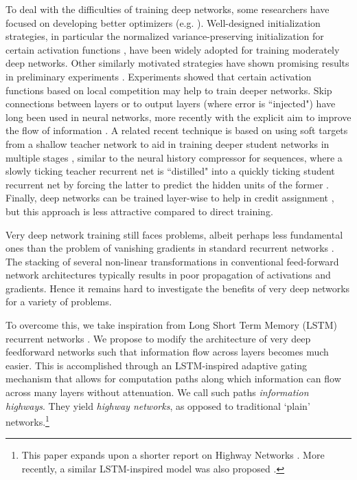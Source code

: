 \documentclass{article}
\begin{document}
To deal with the difficulties of training deep networks, some researchers have focused on developing better optimizers (e.g. \cite{Martens2012,Sutskever2013,Dauphin2014}). Well-designed initialization strategies, in particular the normalized variance-preserving initialization for certain activation functions \cite{Glorot2010,He2015}, have been widely adopted for training moderately deep networks. Other similarly motivated strategies have shown promising results in preliminary experiments \cite{Sussillo2014,Saxe2013}.
Experiments showed that certain activation functions based on local competition \cite{Goodfellow2013,Srivastava2013} may help to train deeper networks.
Skip connections between layers or to output layers (where error is ``injected") have long been used in neural networks, more recently with the explicit aim to improve the flow of information \cite{Raiko2012,Graves2013,Szegedy2014,Lee2015}. 
A related recent technique is based on using soft targets from a shallow teacher network to aid in training deeper student networks in multiple stages \cite{Romero2014}, similar to the neural history compressor for sequences, where a slowly ticking teacher recurrent net is ``distilled" into a quickly ticking student recurrent net by forcing the latter to predict the hidden units of the former \cite{Schmidhuber1992}. Finally, deep networks can be trained layer-wise to help in credit assignment \cite{Schmidhuber1992,Hinton2006}, but this approach is less attractive compared to direct training.

Very deep network training still faces problems, albeit perhaps less fundamental ones than the problem of vanishing gradients in standard recurrent networks \cite{Hochreiter1991}. The stacking of several non-linear transformations in conventional feed-forward network architectures typically results in poor propagation of activations and gradients. Hence it remains hard to investigate the benefits of very deep networks for a variety of problems.


To overcome this, we take inspiration from Long Short Term Memory (LSTM) recurrent networks \cite{Hochreiter1997,Gers1999}. We propose to modify the architecture of very deep feedforward networks such that information flow across layers becomes much easier. This is accomplished through an LSTM-inspired adaptive gating mechanism that allows for computation paths along which information can flow across many layers without attenuation. We call such paths \emph{information highways}. They yield \emph{highway networks}, as opposed to traditional `plain' networks.\footnote{This paper expands upon a shorter report on Highway Networks \cite{Srivastava2015}. More recently, a similar LSTM-inspired model was also proposed \cite{Kalchbrenner2015}.}
\end{document}
